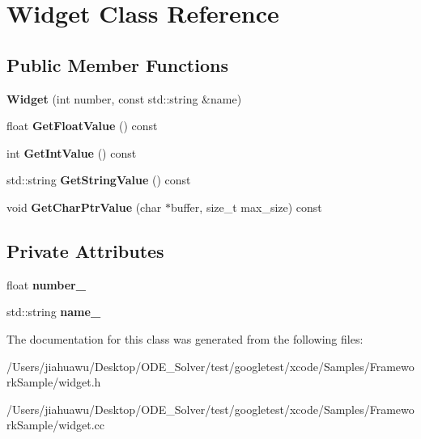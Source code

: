 \hypertarget{class_widget}{}\section{Widget Class Reference}
\label{class_widget}
\subsection*{Public Member Functions}
\begin{DoxyCompactItemize}
\item 
\mbox{\label{class_widget_ab573b75a8a69d29c298af2485fb9cda9}} 
{\bfseries Widget} (int number, const std\+::string \&name)
\item 
\mbox{\label{class_widget_abf639d975e02cabda8132873aca1a333}} 
float {\bfseries Get\+Float\+Value} () const
\item 
\mbox{\label{class_widget_a15e7d0423020a7a98063a749fb97bdd3}} 
int {\bfseries Get\+Int\+Value} () const
\item 
\mbox{\label{class_widget_a7a6e3a7fca3a9373f631c94dc1494d22}} 
std\+::string {\bfseries Get\+String\+Value} () const
\item 
\mbox{\label{class_widget_a50791a556979f22f5593383143c7f815}} 
void {\bfseries Get\+Char\+Ptr\+Value} (char $\ast$buffer, size\+\_\+t max\+\_\+size) const
\end{DoxyCompactItemize}
\subsection*{Private Attributes}
\begin{DoxyCompactItemize}
\item 
\mbox{\label{class_widget_a27a2b3fd66372d5731fa9a6bcaab755b}} 
float {\bfseries number\+\_\+}
\item 
\mbox{\label{class_widget_a1d2f74810f3f912270a681e0671a7a55}} 
std\+::string {\bfseries name\+\_\+}
\end{DoxyCompactItemize}


The documentation for this class was generated from the following files\+:\begin{DoxyCompactItemize}
\item 
/\+Users/jiahuawu/\+Desktop/\+O\+D\+E\+\_\+\+Solver/test/googletest/xcode/\+Samples/\+Framework\+Sample/widget.\+h\item 
/\+Users/jiahuawu/\+Desktop/\+O\+D\+E\+\_\+\+Solver/test/googletest/xcode/\+Samples/\+Framework\+Sample/widget.\+cc\end{DoxyCompactItemize}

